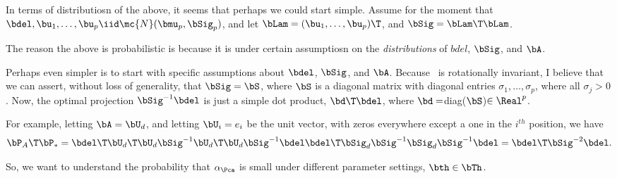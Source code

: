 \documentclass[10pt]{article}
\begin{document}
In terms of distributiosn of the above, it seems that perhaps we could start simple.
Assume for the moment that $\bdel,\bu_1,\ldots,\bu_p \iid \mc{N}(\bmu_p, \bSig_p)$, and let $\bLam=(\bu_1,\ldots,\bu_p)\T$, and $\bSig = \bLam\T \bLam$.  

The reason the above is probabilistic is because it is under certain assumptiosn on the \emph{distributions} of $bdel$, $\bSig$, and $\bA$.   


Perhaps even simpler is to start with specific assumptions about $\bdel$, $\bSig$, and $\bA$. Because \Lda~is rotationally invariant, I believe that we can assert, without loss of generality, that $\bSig=\bS$, where $\bS$ is a diagonal matrix with diagonal entries $\sigma_1,\ldots, \sigma_p$, where all $\sigma_j > 0$.
Now, the optimal projection $\bSig^{-1} \bdel$ is just a simple dot product,  $\bd\T \bdel$, where $\bd=$diag($\bS$)$\in \Real^p$.


For example, letting $\bA=\bU_d$, and letting $\bU_i=e_i$ be the unit vector, with zeros everywhere except a one in the $i^{th}$ position,  we have
\begin{align*}
\bP_A\T \bP_* %
= \bdel\T \bU_d\T \bU_d \bSig^{-1} \bU_d\T \bU_d \bSig^{-1} \bdel %
\bdel\T \bSig_d \bSig^{-1} \bSig_d \bSig^{-1} \bdel %
= \bdel\T \bSig^{-2} \bdel.
\end{align*}






So, we want to understand the probability that $\alpha_{\Pca}$ is small under different parameter settings, $\bth \in \bTh$.  





\clearpage
% 


\end{document}
